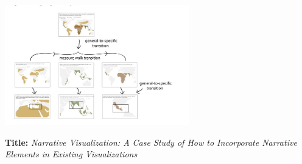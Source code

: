 \documentclass{egpubl}
\begin{document}
\begingroup
\centering
\includegraphics[width=8cm]{./images/hullman2013deeper}
\label{fig:hullman2013deeper}
\endgroup



\textbf{Title:} \textit{Narrative Visualization: A Case Study of How to Incorporate Narrative Elements in Existing Visualizations}
\end{document}
